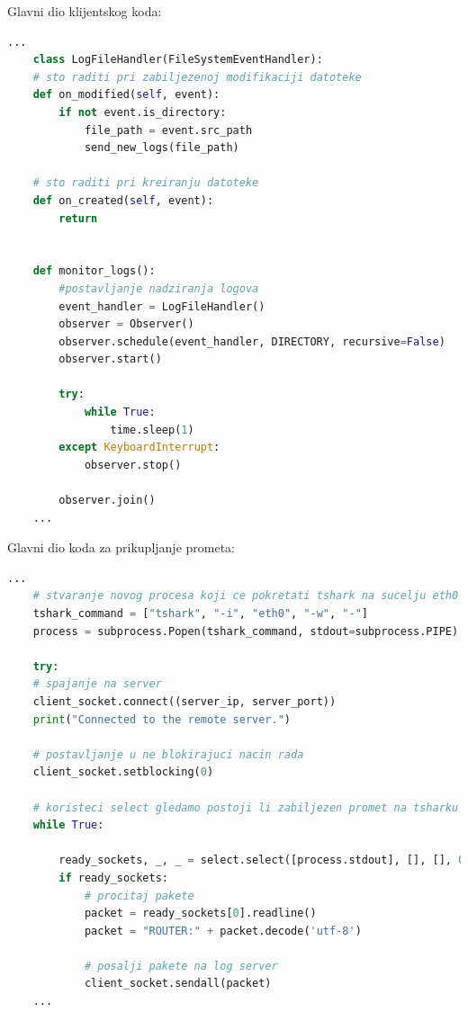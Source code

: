 \documentclass[times, utf8, zavrsni]{fer}
\begin{document}
Glavni dio klijentskog koda:
\begin{lstlisting}[language=python, basicstyle=\footnotesize]
    ...
    class LogFileHandler(FileSystemEventHandler):
    # sto raditi pri zabiljezenoj modifikaciji datoteke
    def on_modified(self, event):
        if not event.is_directory:
            file_path = event.src_path
            send_new_logs(file_path)
            
    # sto raditi pri kreiranju datoteke
    def on_created(self, event):
        return


    def monitor_logs():
        #postavljanje nadziranja logova
        event_handler = LogFileHandler()
        observer = Observer()
        observer.schedule(event_handler, DIRECTORY, recursive=False)
        observer.start()

        try:
            while True:
                time.sleep(1)
        except KeyboardInterrupt:
            observer.stop()

        observer.join()
    ...
\end{lstlisting}

Glavni dio koda za prikupljanje prometa:
\begin{lstlisting}[language=python, basicstyle=\footnotesize]
    ...
    # stvaranje novog procesa koji ce pokretati tshark na sucelju eth0
    tshark_command = ["tshark", "-i", "eth0", "-w", "-"]
    process = subprocess.Popen(tshark_command, stdout=subprocess.PIPE)

    try:
    # spajanje na server
    client_socket.connect((server_ip, server_port))
    print("Connected to the remote server.")

    # postavljanje u ne blokirajuci nacin rada
    client_socket.setblocking(0)

    # koristeci select gledamo postoji li zabiljezen promet na tsharku koji mozemo prosljediti
    while True:
        
        ready_sockets, _, _ = select.select([process.stdout], [], [], 0)
        if ready_sockets:
            # procitaj pakete
            packet = ready_sockets[0].readline()
            packet = "ROUTER:" + packet.decode('utf-8')

            # posalji pakete na log server
            client_socket.sendall(packet)
    ...
\end{lstlisting}
\end{document}
